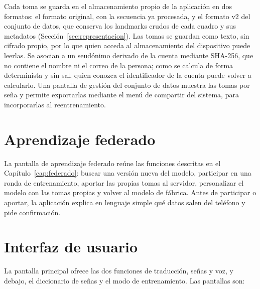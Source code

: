 Cada toma se guarda en el almacenamiento propio de la aplicación en dos formatos: el formato original, con la secuencia ya procesada, y el formato v2 del conjunto de datos, que conserva los landmarks crudos de cada cuadro y sus metadatos (Sección~\ref{sec:representacion}). Las tomas se guardan como texto, sin cifrado propio, por lo que quien acceda al almacenamiento del dispositivo puede leerlas. Se asocian a un seudónimo derivado de la cuenta mediante SHA-256, que no contiene el nombre ni el correo de la persona; como se calcula de forma determinista y sin sal, quien conozca el identificador de la cuenta puede volver a calcularlo. Una pantalla de gestión del conjunto de datos muestra las tomas por seña y permite exportarlas mediante el menú de compartir del sistema, para incorporarlas al reentrenamiento.

\section{Aprendizaje federado}

La pantalla de aprendizaje federado reúne las funciones descritas en el Capítulo~\ref{cap:federado}: buscar una versión nueva del modelo, participar en una ronda de entrenamiento, aportar las propias tomas al servidor, personalizar el modelo con las tomas propias y volver al modelo de fábrica. Antes de participar o aportar, la aplicación explica en lenguaje simple qué datos salen del teléfono y pide confirmación.

\section{Interfaz de usuario}

La pantalla principal ofrece las dos funciones de traducción, señas y voz, y debajo, el diccionario de señas y el modo de entrenamiento. Las pantallas son:


